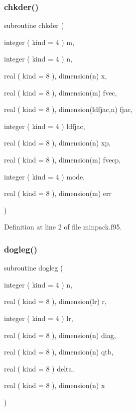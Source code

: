 \subsubsection{\texorpdfstring{chkder()}{chkder()}}
{\footnotesize\ttfamily subroutine chkder (\begin{DoxyParamCaption}\item[{integer ( kind = 4 )}]{m,  }\item[{integer ( kind = 4 )}]{n,  }\item[{real ( kind = 8 ), dimension(n)}]{x,  }\item[{real ( kind = 8 ), dimension(m)}]{fvec,  }\item[{real ( kind = 8 ), dimension(ldfjac,n)}]{fjac,  }\item[{integer ( kind = 4 )}]{ldfjac,  }\item[{real ( kind = 8 ), dimension(n)}]{xp,  }\item[{real ( kind = 8 ), dimension(m)}]{fvecp,  }\item[{integer ( kind = 4 )}]{mode,  }\item[{real ( kind = 8 ), dimension(m)}]{err }\end{DoxyParamCaption})}



Definition at line 2 of file minpack.\+f95.

\mbox{\label{minpack_8f95_ab5a1319962e4855e0a2b7a7431085275}} 
\subsubsection{\texorpdfstring{dogleg()}{dogleg()}}
{\footnotesize\ttfamily subroutine dogleg (\begin{DoxyParamCaption}\item[{integer ( kind = 4 )}]{n,  }\item[{real ( kind = 8 ), dimension(lr)}]{r,  }\item[{integer ( kind = 4 )}]{lr,  }\item[{real ( kind = 8 ), dimension(n)}]{diag,  }\item[{real ( kind = 8 ), dimension(n)}]{qtb,  }\item[{real ( kind = 8 )}]{delta,  }\item[{real ( kind = 8 ), dimension(n)}]{x }\end{DoxyParamCaption})}



